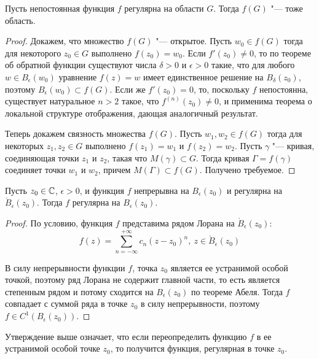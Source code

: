 \begin{theorem}
	Пусть непостоянная функция $f$ регулярна на области $G$. Тогда $f(G)$ "--- тоже область.
\end{theorem}

\begin{proof}
	Докажем, что множество $f(G)$ "--- открытое. Пусть $w_0 \in f(G)$ тогда для некоторого $z_0 \in G$ выполнено $f(z_0) = w_0$. Если $f'(z_0) \ne 0$, то по теореме об обратной функции существуют числа $\delta > 0$ и $\epsilon > 0$ такие, что для любого $w \in B_\epsilon(w_0)$ уравнение $f(z) = w$ имеет единственное решение на $B_\delta(z_0)$, поэтому $B_\epsilon(w_0) \subset f(G)$. Если же $f'(z_0) = 0$, то, поскольку $f$ непостоянна, существует натуральное $n > 2$ такое, что $f^{(n)}(z_0) \ne 0$, и применима теорема о локальной структуре отображения, дающая аналогичный результат.
	
	Теперь докажем связность множества $f(G)$. Пусть $w_1, w_2 \in f(G)$ тогда для некоторых $z_1, z_2 \in G$ выполнено $f(z_1) = w_1$ и $f(z_2) = w_2$. Пусть $\gamma$ "--- кривая, соединяющая точки $z_1$ и $z_2$, такая что $M(\gamma) \subset G$. Тогда кривая $\Gamma = f(\gamma)$ соединяет точки $w_1$ и $w_2$, причем $M(\Gamma) \subset f(G)$. Получено требуемое.
\end{proof}

\begin{proposition}
	Пусть $z_0 \in \mathbb{C}$, $\epsilon > 0$, и функция $f$ непрерывна на $B_\epsilon(z_0)$ и регулярна на $\mathring B_\epsilon(z_0)$. Тогда $f$ регулярна на $B_\epsilon(z_0)$.
\end{proposition}

\begin{proof}
	По условию, функция $f$ представима рядом Лорана на $\mathring B_\epsilon(z_0)$:
	\[f(z) = \sum_{n = -\infty}^{+\infty}c_n(z-z_0)^n,~z \in \mathring B_\epsilon(z_0)\]
	
	В силу непрерывности функции $f$, точка $z_0$ является ее устранимой особой точкой, поэтому ряд Лорана не содержит главной части, то есть является степенным рядом и потому сходится на $B_\epsilon(z_0)$ по теореме Абеля. Тогда $f$ совпадает с суммой ряда в точке $z_0$ в силу непрерывности, поэтому $f \in C^1(B_\epsilon(z_0))$.
\end{proof}

\begin{note}
	Утверждение выше означает, что если переопределить функцию $f$ в ее устранимой особой точке $z_0$, то получится функция, регулярная в точке $z_0$.
\end{note}